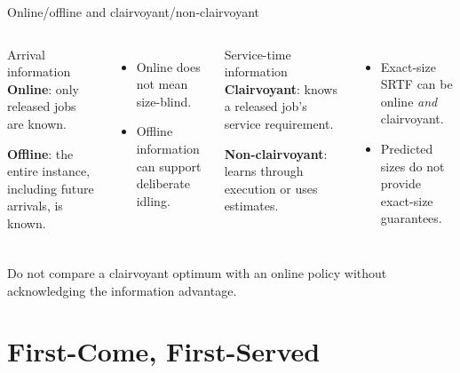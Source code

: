 \documentclass[aspectratio=169,11pt]{beamer}
\begin{document}
\begin{frame}{Online/offline and clairvoyant/non-clairvoyant}
  \begin{columns}[T,onlytextwidth]
      \begin{block}{Arrival information}
        \textbf{Online}: only released jobs are known.\par
        \textbf{Offline}: the entire instance, including future arrivals, is known.
      \end{block}
      \begin{itemize}
        \item Online does not mean size-blind.
        \item Offline information can support deliberate idling.
      \end{itemize}
      \begin{block}{Service-time information}
        \textbf{Clairvoyant}: knows a released job's service requirement.\par
        \textbf{Non-clairvoyant}: learns through execution or uses estimates.
      \end{block}
      \begin{itemize}
        \item Exact-size SRTF can be online \emph{and} clairvoyant.
        \item Predicted sizes do not provide exact-size guarantees.
      \end{itemize}
  \end{columns}
  \begin{tcolorbox}[title=Evaluation rule]
    Do not compare a clairvoyant optimum with an online policy without acknowledging the information advantage.
  \end{tcolorbox}
\end{frame}

\section{First-Come, First-Served}
\end{document}
